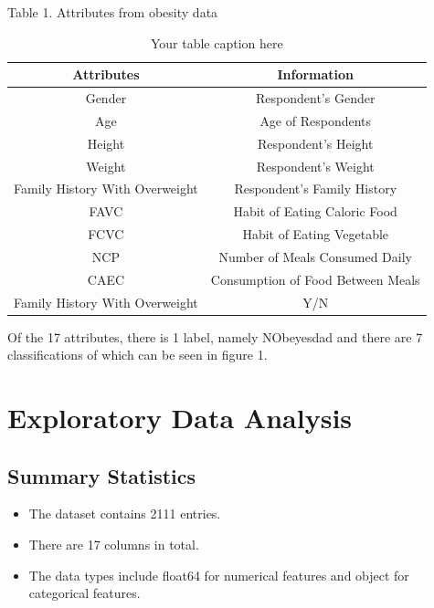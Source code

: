 \documentclass[conference]{IEEEtran}
\begin{document}
Table 1. Attributes from obesity data

\begin{table}[H]
    \centering
    \caption{Your table caption here}
    \begin{tabular}{|c|c|}
    \hline
    \textbf{Attributes} & \textbf{Information} \\
    \hline
    Gender & Respondent's Gender \\
    \hline
    Age & Age of Respondents \\
    \hline
    Height & Respondent's Height \\
    \hline
    Weight & Respondent's Weight \\
    \hline
    Family History With Overweight & Respondent's Family History \\
    \hline
    FAVC & Habit of Eating Caloric Food \\
    \hline
    FCVC & Habit of Eating Vegetable \\
    \hline
    NCP & Number of Meals Consumed Daily \\
    \hline
    CAEC & Consumption of Food Between Meals \\
    \hline
    Family History With Overweight & Y/N \\
    \hline
    \end{tabular}
\end{table}

Of the 17 attributes, there is 1 label, namely NObeyesdad and there are 7 classifications of which can be seen in figure 1.

\begin{center}
\end{center}

\section{Exploratory Data Analysis}
\subsection{Summary Statistics}\label{AA}
\begin{itemize}
    \item The dataset contains 2111 entries.
    \item There are 17 columns in total.
    \item The data types include float64 for numerical features and object for categorical features.
\end{itemize}
\end{document}
